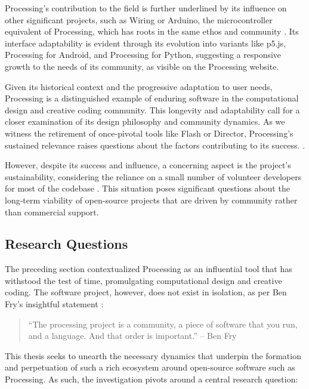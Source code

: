 Processing's contribution to the field is further underlined by its influence on other significant projects, such as Wiring or Arduino, the microcontroller equivalent of Processing, which has roots in the same ethos and community \parencite{barraganUntoldHistoryArduino2016}. Its interface adaptability is evident through its evolution into variants like p5.js, Processing for Android, and Processing for Python, suggesting a responsive growth to the needs of its community, as visible on the Processing website. \parencite{processingfoundationProcessingWebsite}

Given its historical context and the progressive adaptation to user needs, Processing is a distinguished example of enduring software in the computational design and creative coding community. This longevity and adaptability call for a closer examination of its design philosophy and community dynamics. As we witness the retirement of once‐pivotal tools like Flash or Director, Processing's sustained relevance raises questions about the factors contributing to its success. \parencite{hortonDeathTechnicalSkill2020} \parencite{jobsThoughtsFlash2010} \parencite{adobecreativecloudteamFutureAdobeContribute2017}.

However, despite its success and influence, a concerning aspect is the project's sustainability, considering the reliance on a small number of volunteer developers for most of the codebase \parencite{fryModernPrometheusHistory2018}. This situation poses significant questions about the long‐term viability of open-source projects that are driven by community rather than commercial support.

\subsection{Research Questions}
The preceding section contextualized Processing as an influential tool that has withstood the test of time, promulgating computational design and creative coding. The software project, however, does not exist in isolation, as per Ben Fry's insightful statement :

\begin{quote}
  \enquote{The processing project is a community, a piece of software that you run, and a language. And that order is important.} – Ben Fry \parencite[19:22]{artsatmit2017CASTSymposium2017}
\end{quote}\label{fry_quote}

This thesis seeks to unearth the necessary dynamics that underpin the formation and perpetuation of such a rich ecosystem around open-source software such as Processing. As such, the investigation pivots around a central research question:


